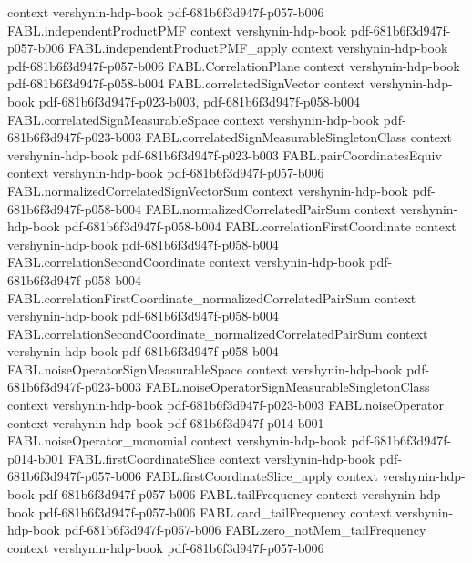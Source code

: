 \begin{theorem}
  {context}
  {vershynin-hdp-book}
  {pdf-681b6f3d947f-p057-b006}
\proofstep
  {FABL.independentProductPMF}
  {context}
  {vershynin-hdp-book}
  {pdf-681b6f3d947f-p057-b006}
\proofstep
  {FABL.independentProductPMF_apply}
  {context}
  {vershynin-hdp-book}
  {pdf-681b6f3d947f-p057-b006}
\proofstep
  {FABL.CorrelationPlane}
  {context}
  {vershynin-hdp-book}
  {pdf-681b6f3d947f-p058-b004}
\proofstep
  {FABL.correlatedSignVector}
  {context}
  {vershynin-hdp-book}
  {pdf-681b6f3d947f-p023-b003,
    pdf-681b6f3d947f-p058-b004}
\proofstep
  {FABL.correlatedSignMeasurableSpace}
  {context}
  {vershynin-hdp-book}
  {pdf-681b6f3d947f-p023-b003}
\proofstep
  {FABL.correlatedSignMeasurableSingletonClass}
  {context}
  {vershynin-hdp-book}
  {pdf-681b6f3d947f-p023-b003}
\proofstep
  {FABL.pairCoordinatesEquiv}
  {context}
  {vershynin-hdp-book}
  {pdf-681b6f3d947f-p057-b006}
\proofstep
  {FABL.normalizedCorrelatedSignVectorSum}
  {context}
  {vershynin-hdp-book}
  {pdf-681b6f3d947f-p058-b004}
\proofstep
  {FABL.normalizedCorrelatedPairSum}
  {context}
  {vershynin-hdp-book}
  {pdf-681b6f3d947f-p058-b004}
\proofstep
  {FABL.correlationFirstCoordinate}
  {context}
  {vershynin-hdp-book}
  {pdf-681b6f3d947f-p058-b004}
\proofstep
  {FABL.correlationSecondCoordinate}
  {context}
  {vershynin-hdp-book}
  {pdf-681b6f3d947f-p058-b004}
\proofstep
  {FABL.correlationFirstCoordinate_normalizedCorrelatedPairSum}
  {context}
  {vershynin-hdp-book}
  {pdf-681b6f3d947f-p058-b004}
\proofstep
  {FABL.correlationSecondCoordinate_normalizedCorrelatedPairSum}
  {context}
  {vershynin-hdp-book}
  {pdf-681b6f3d947f-p058-b004}
\proofstep
  {FABL.noiseOperatorSignMeasurableSpace}
  {context}
  {vershynin-hdp-book}
  {pdf-681b6f3d947f-p023-b003}
\proofstep
  {FABL.noiseOperatorSignMeasurableSingletonClass}
  {context}
  {vershynin-hdp-book}
  {pdf-681b6f3d947f-p023-b003}
\proofstep
  {FABL.noiseOperator}
  {context}
  {vershynin-hdp-book}
  {pdf-681b6f3d947f-p014-b001}
\proofstep
  {FABL.noiseOperator_monomial}
  {context}
  {vershynin-hdp-book}
  {pdf-681b6f3d947f-p014-b001}
\proofstep
  {FABL.firstCoordinateSlice}
  {context}
  {vershynin-hdp-book}
  {pdf-681b6f3d947f-p057-b006}
\proofstep
  {FABL.firstCoordinateSlice_apply}
  {context}
  {vershynin-hdp-book}
  {pdf-681b6f3d947f-p057-b006}
\proofstep
  {FABL.tailFrequency}
  {context}
  {vershynin-hdp-book}
  {pdf-681b6f3d947f-p057-b006}
\proofstep
  {FABL.card_tailFrequency}
  {context}
  {vershynin-hdp-book}
  {pdf-681b6f3d947f-p057-b006}
\proofstep
  {FABL.zero_notMem_tailFrequency}
  {context}
  {vershynin-hdp-book}
  {pdf-681b6f3d947f-p057-b006}

\end{theorem}
